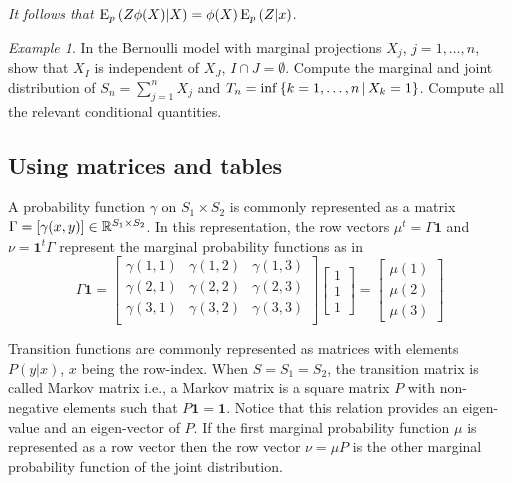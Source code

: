 \documentclass[12pt,a4paper]{amsart}
\newcommand{\one}{\bm 1}
\theoremstyle{plain}%
\theoremstyle{definition}
\theoremstyle{remark}
\newtheorem{example}{Example}
\begin{document}
\emph{It follows that $\operatorname{E}_{p}\left(Z\phi(X) \middle| X\right) = \phi(X) \operatorname{E}_{p}\left(Z \middle| x\right)$}.

\begin{example}
In the Bernoulli model with marginal projections $X_j$, $j=1,\dots,n$,
show that $X_I$ is independent of $X_J$, $I \cap J =
\emptyset$. Compute the marginal and joint distribution of $S_n = \sum_{j=1}^n X_j$ and $T_n = \inf\left\{k=1,\dots,n \, \middle| \, X_k=1 \right\}$. Compute all the relevant conditional quantities. 
\end{example}

\subsection{Using matrices and tables}
\label{sec:using-matr-tabl}
A probability function $\gamma$ on $S_1 \times S_2$ is commonly represented as a matrix $\Gamma = [\gamma(x,y)] \in \mathbb{R}^{S_1 \times S_2}$. In this representation, the row vectors $\mu^t = \Gamma \one$ and $\nu = \one^t \Gamma$ represent the marginal probability functions as in
\begin{equation*}
  \Gamma \one =
  \begin{bmatrix}
    \gamma(1,1)  & \gamma(1,2) & \gamma(1,3) \\
    \gamma(2,1)  & \gamma(2,2) & \gamma(2,3) \\
    \gamma(3,1)  & \gamma(3,2) & \gamma(3,3) \\
  \end{bmatrix}
  \begin{bmatrix}
    1 \\ 1 \\ 1
  \end{bmatrix} =
  \begin{bmatrix}
    \mu(1) \\
    \mu(2) \\
    \mu(3) 
  \end{bmatrix}
\end{equation*}


Transition functions are commonly represented as matrices with elements $P(y|x)$, $x$ being the row-index. When $S=S_1=S_2$, the transition matrix is called Markov matrix i.e., a Markov matrix is a square matrix $P$ with non-negative elements such that $P \one = \one$. Notice that this relation provides an eigen-value and an eigen-vector of $P$. If the first marginal probability function $\mu$ is represented as a row vector then the row vector $\nu = \mu P$ is the other marginal probability function of the joint distribution.
\end{document}
